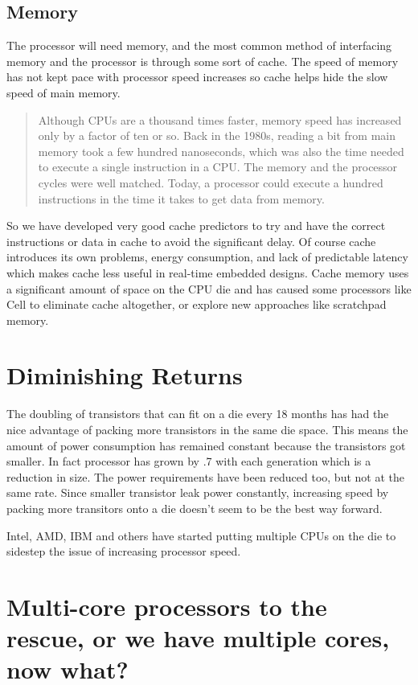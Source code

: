 \documentclass[12pt,twoside,letterpaper]{article}
\begin{document}
\subsection*{Memory}
The processor will need memory, and the most common method of interfacing memory and the processor is through some sort of cache. The speed of memory has not kept pace with processor speed increases so cache helps hide the slow speed of main memory.  

\begin{quote}
Although CPUs are a thousand times faster, memory speed has increased only by a factor of ten or so. Back in the 1980s, reading a bit from main memory took a few hundred nanoseconds, which was also the time needed to execute a single instruction in a CPU. The memory and the processor cycles were well matched. Today, a processor could execute a hundred instructions in the time it takes to get data from memory.
\end{quote}

So we have developed very good cache predictors to try and have the correct instructions or data in cache to avoid the significant delay. Of course cache introduces its own problems, energy consumption, and lack of predictable latency which makes cache less useful in real-time embedded designs. Cache memory uses a significant amount of space on the CPU die and has caused some processors like Cell to eliminate cache altogether, or explore new approaches like scratchpad memory.

\section*{Diminishing Returns}
The doubling of transistors that can fit on a die every 18 months has had the nice advantage of packing more transistors in the same die space. This means the amount of power consumption has remained constant because the transistors got smaller. In fact processor has grown by .7 with each generation which is a reduction in size. The power requirements have been reduced too, but not at the same rate. Since smaller transistor leak power constantly, increasing speed by packing more transitors onto a die doesn't seem to be the best way forward.

Intel, AMD, IBM and others have started putting multiple CPUs on the die to sidestep the issue of increasing processor speed.

\section*{Multi-core processors to the rescue, or we have multiple cores, now what?}
\end{document}
